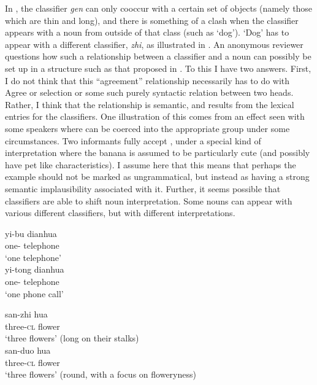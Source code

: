 \documentclass[output=paper
,modfonts
,nonflat]{langsci/langscibook}
\begin{document}
In , the classifier \textit{gen} can only cooccur with a certain set of objects (namely those which are thin and long), and there is something of a clash when the classifier appears with a noun from outside of that class (such as `dog'). `Dog' has to appear with a different classifier, \textit{zhi}, as illustrated in . An anonymous reviewer questions how such a relationship between a classifier and a noun can possibly be set up in a structure such as that proposed in . To this I have two answers. First, I do not think that this ``agreement'' relationship necessarily has to do with Agree or selection or some such purely syntactic relation between two heads. Rather, I think that the relationship is semantic, and results from the lexical entries for the classifiers. One illustration of this comes from an effect seen with some speakers where  can be coerced into the appropriate group under some circumstances. Two informants fully accept , under a special kind of interpretation where the banana is assumed to be particularly cute (and possibly have pet like characteristics). I assume here that this means that perhaps the example should not be marked as ungrammatical, but instead as having a strong semantic implausibility associated with it. Further, it seems possible that classifiers are able to shift noun interpretation. Some nouns can appear with various different classifiers, but with different interpretations.

\ea \label{ex:hall:42}
\ea 
\gll
yi-bu dianhua \\
one-{} telephone \\
\glt 
`one telephone' \\

\ex 
\gll
yi-tong dianhua \\
one-{} telephone \\
\glt
`one phone call' \\
\z 
\z 

\ea \label{ex:hall:43}
\ea 
\gll
san-zhi hua \\
three-\textsc{cl} flower \\
\glt
`three flowers' (long on their stalks) \\

\ex 
\gll
san-duo hua \\
three-\textsc{cl} flower \\
\glt
`three flowers' (round, with a focus on floweryness) \\
\z 
\z
\end{document}
